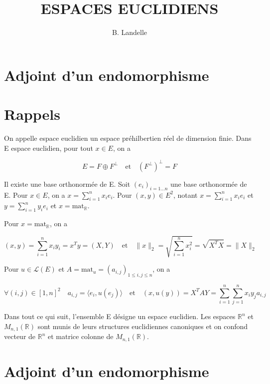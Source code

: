

\title{ESPACES EUCLIDIENS}
\author{B. Landelle}
\date{}
\maketitle

\tableofcontents

\section*{Adjoint d'un endomorphisme}



\section{Rappels}

On appelle espace euclidien un espace préhilbertien réel de dimension finie. Dans E espace euclidien, pour tout $x \in E$, on a

\[ E = F \oplus F^\perp \quad \text{et} \quad (F^\perp)^\perp = F \]

Il existe une base orthonormée de E. Soit $\left(e_i\right)_{i=1 \dots n}$ une base orthonormée de E. Pour $x \in E$, on a $x = \sum_{i=1}^n x_i e_i$. Pour $(x, y) \in E^2$, notant $x = \sum_{i=1}^n x_i e_i$ et $y = \sum_{i=1}^n y_i e_i$ et $x = \text{mat}_{\mathbb{R}}$.

Pour $x = \text{mat}_{\mathbb{R}}$, on a

\[ (x, y) = \sum_{i=1}^n x_i y_i = x^T y = (X, Y) \quad \text{et} \quad \|x\|_2 = \sqrt{\sum_{i=1}^n x_i^2} = \sqrt{X^T X} = \|X\|_2 \]

Pour $u \in \mathcal{L}(E)$ et $A = \text{mat}_u = (a_{i, j})_{1 \leq i, j \leq n}$, on a

\[ \forall (i, j) \in [1, n]^2 \quad a_{i, j} = \langle e_i, u(e_j) \rangle \quad \text{et} \quad (x, u(y)) = X^T A Y = \sum_{i=1}^n \sum_{j=1}^n x_i y_j a_{i, j} \]

Dans tout ce qui suit, l'ensemble E désigne un espace euclidien. Les espaces $\mathbb{R}^n$ et $M_{n, 1}(\mathbb{R})$ sont munis de leurs structures euclidiennes canoniques et on confond vecteur de $\mathbb{R}^n$ et matrice colonne de $M_{n, 1}(\mathbb{R})$.

\section{Adjoint d'un endomorphisme}


